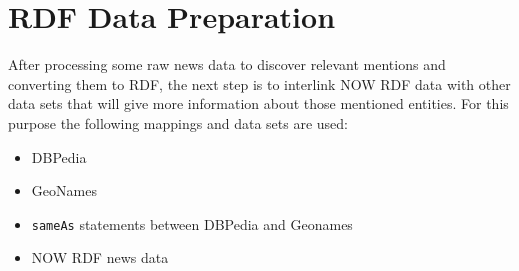 \section{RDF Data Preparation}
After processing some raw news data to discover relevant mentions and converting them to RDF, the next step is to interlink NOW RDF data with other data sets that will give more information about those mentioned entities. For this purpose the following mappings and data sets are used: 
\begin{itemize}
    \item DBPedia
    \item GeoNames
    \item \verb|sameAs| statements between DBPedia and Geonames
    \item NOW RDF news data
\end{itemize}

